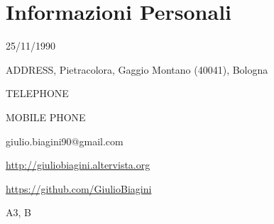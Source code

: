 %
%
%
%
%
%



\section{Informazioni Personali}

{25/11/1990}

{ADDRESS, Pietracolora, Gaggio Montano (40041), Bologna}%

{TELEPHONE}%

{MOBILE PHONE}%

{giulio.biagini90@gmail.com}

{\url{http://giuliobiagini.altervista.org}}

{\url{https://github.com/GiulioBiagini}}

{A3, B}
